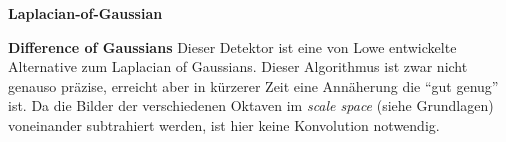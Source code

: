 \textbf{Laplacian-of-Gaussian} %

\textbf{Difference of Gaussians} Dieser Detektor ist eine von Lowe entwickelte Alternative zum Laplacian of Gaussians. Dieser Algorithmus ist zwar nicht genauso präzise, erreicht aber in kürzerer Zeit eine Annäherung die \enquote{gut genug} ist. Da die Bilder der verschiedenen Oktaven im \textit{scale space} (siehe Grundlagen) voneinander subtrahiert werden, ist hier keine Konvolution notwendig. 


